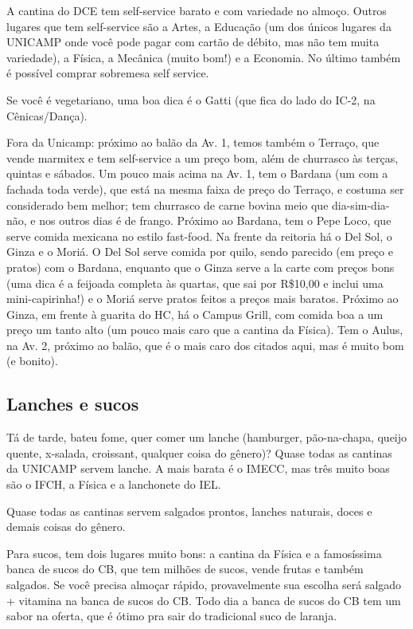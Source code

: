 \documentclass[a4paper,10pt]{article}
\begin{document}
A cantina do DCE tem self-service barato e com variedade no almoço. Outros
lugares que tem self-service são a Artes, a Educação (um dos únicos lugares da
UNICAMP onde você pode pagar com cartão de débito, mas não tem muita variedade),
a Física, a Mecânica (muito bom!) e a Economia. No último também é possível
comprar sobremesa self service.

Se você é vegetariano, uma boa dica é o Gatti (que fica do lado do IC-2, na
Cênicas/Dança). 

Fora da Unicamp: próximo ao balão da Av. 1, temos também o Terraço, que vende
marmitex e tem self-service a um preço bom, além de churrasco às terças, quintas
e sábados. Um pouco mais acima na Av. 1, tem o Bardana (um com a fachada toda
verde), que está na mesma faixa de preço do Terraço, e costuma ser considerado
bem melhor; tem churrasco de carne bovina meio que dia-sim-dia-não, e nos outros
dias é de frango. Próximo ao Bardana, tem o Pepe Loco, que serve comida mexicana
no estilo fast-food. Na frente da reitoria há o Del Sol, o Ginza e o Moriá.
O Del Sol serve comida por quilo, sendo parecido (em preço e pratos) com
o Bardana, enquanto que o Ginza serve a la carte com preços bons (uma dica
é a feijoada completa às quartas, que sai por R\$10,00 e inclui uma
mini-capirinha!) e o Moriá serve pratos feitos a preços mais baratos. Próximo ao
Ginza, em frente à guarita do HC, há o Campus Grill, com comida boa a um preço
um tanto alto (um pouco mais caro que a cantina da Física). Tem o Aulus, na Av.
2, próximo ao balão, que é o mais caro dos citados aqui, mas é muito bom (e
bonito). 

\subsection{Lanches e sucos}
Tá de tarde, bateu fome, quer comer um lanche (hamburger, pão-na-chapa, queijo
quente, x-salada, croissant, qualquer coisa do gênero)? Quase todas as cantinas
da UNICAMP servem lanche. A mais barata é o IMECC, mas três muito boas são
o IFCH, a Física e a lanchonete do IEL.

Quase todas as cantinas servem salgados prontos, lanches naturais, doces
e demais coisas do gênero.

Para sucos, tem dois lugares muito bons: a cantina da Física e a famosíssima
banca de sucos do CB, que tem milhões de sucos, vende frutas e também salgados.
Se você precisa almoçar rápido, provavelmente sua escolha será salgado
+ vitamina na banca de sucos do CB. Todo dia a banca de sucos do CB tem um sabor
na oferta, que é ótimo pra sair do tradicional suco de laranja.
\end{document}
